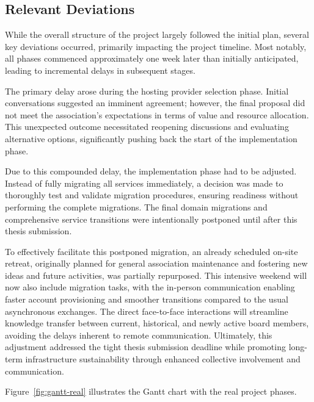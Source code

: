 \subsection*{Relevant Deviations}

While the overall structure of the project largely followed the initial plan, several key deviations occurred, primarily impacting the project timeline. Most notably, all phases commenced approximately one week later than initially anticipated, leading to incremental delays in subsequent stages.

The primary delay arose during the hosting provider selection phase. Initial conversations suggested an imminent agreement; however, the final proposal did not meet the association's expectations in terms of value and resource allocation. This unexpected outcome necessitated reopening discussions and evaluating alternative options, significantly pushing back the start of the implementation phase.

Due to this compounded delay, the implementation phase had to be adjusted. Instead of fully migrating all services immediately, a decision was made to thoroughly test and validate migration procedures, ensuring readiness without performing the complete migrations. The final domain migrations and comprehensive service transitions were intentionally postponed until after this thesis submission.

To effectively facilitate this postponed migration, an already scheduled on-site retreat, originally planned for general association maintenance and fostering new ideas and future activities, was partially repurposed. This intensive weekend will now also include migration tasks, with the in-person communication enabling faster account provisioning and smoother transitions compared to the usual asynchronous exchanges. The direct face-to-face interactions will streamline knowledge transfer between current, historical, and newly active board members, avoiding the delays inherent to remote communication. Ultimately, this adjustment addressed the tight thesis submission deadline while promoting long-term infrastructure sustainability through enhanced collective involvement and communication.

Figure~\ref{fig:gantt-real} illustrates the Gantt chart with the real project phases.


